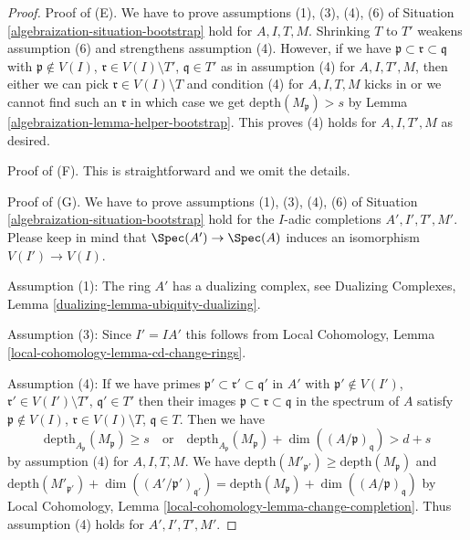 \begin{proof}

Proof of (E). We have to prove assumptions (1), (3), (4), (6)
of Situation \ref{algebraization-situation-bootstrap} hold for
$A, I, T, M$. Shrinking $T$ to $T'$
weakens assumption (6) and strengthens assumption (4). However, if we have
$\mathfrak p \subset \mathfrak r \subset \mathfrak q$ with
$\mathfrak p \not \in V(I)$, $\mathfrak r \in V(I) \setminus T'$,
$\mathfrak q \in T'$ as in assumption (4) for $A, I, T', M$, then
either we can pick $\mathfrak r \in V(I) \setminus T$ and
condition (4) for $A, I, T, M$ kicks in or we cannot
find such an $\mathfrak r$ in which case we get
$\text{depth}(M_\mathfrak p) > s$ by Lemma \ref{algebraization-lemma-helper-bootstrap}.
This proves (4) holds for $A, I, T', M$ as desired.

\medskip\noindent
Proof of (F). This is straightforward and we omit the details.

\medskip\noindent
Proof of (G). We have to prove assumptions (1), (3), (4), (6)
of Situation \ref{algebraization-situation-bootstrap} hold for the $I$-adic
completions $A', I', T', M'$. Please keep in mind that
$\Spec(A') \to \Spec(A)$ induces an isomorphism $V(I') \to V(I)$.

\medskip\noindent
Assumption (1): The ring $A'$ has a dualizing complex, see
Dualizing Complexes, Lemma \ref{dualizing-lemma-ubiquity-dualizing}.

\medskip\noindent
Assumption (3): Since $I' = IA'$ this follows from Local Cohomology,
Lemma \ref{local-cohomology-lemma-cd-change-rings}.

\medskip\noindent
Assumption (4): If we have primes
$\mathfrak p' \subset \mathfrak r' \subset \mathfrak q'$ in $A'$
with $\mathfrak p' \not \in V(I')$,
$\mathfrak r' \in V(I') \setminus T'$,
$\mathfrak q' \in T'$ then their images
$\mathfrak p \subset \mathfrak r \subset \mathfrak q$ in
the spectrum of $A$
satisfy
$\mathfrak p \not \in V(I)$, $\mathfrak r \in V(I) \setminus T$,
$\mathfrak q \in T$.
Then we have
$$
\text{depth}_{A_\mathfrak p}(M_\mathfrak p) \geq s
\quad\text{or}\quad
\text{depth}_{A_\mathfrak p}(M_\mathfrak p) +
\dim((A/\mathfrak p)_\mathfrak q) > d + s
$$
by assumption (4) for $A, I, T, M$. We have
$\text{depth}(M'_{\mathfrak p'}) \geq \text{depth}(M_\mathfrak p)$ and
$\text{depth}(M'_{\mathfrak p'}) +
\dim((A'/\mathfrak p')_{\mathfrak q'}) =
\text{depth}(M_\mathfrak p) +
\dim((A/\mathfrak p)_\mathfrak q)$
by Local Cohomology, Lemma \ref{local-cohomology-lemma-change-completion}.
Thus assumption (4) holds for $A', I', T', M'$.


\end{proof}
